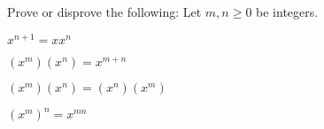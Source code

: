    Prove or disprove the following:
   Let $m,n \geq 0$ be integers.
   \begin{myenum}
   \item $x^{n + 1} = x x^n$
   \item $(x^m)(x^n) = x^{m+n}$
   \item $(x^m)(x^n) = (x^n)(x^m)$
   \item $(x^m)^n = x^{mn}$
   \end{myenum}
